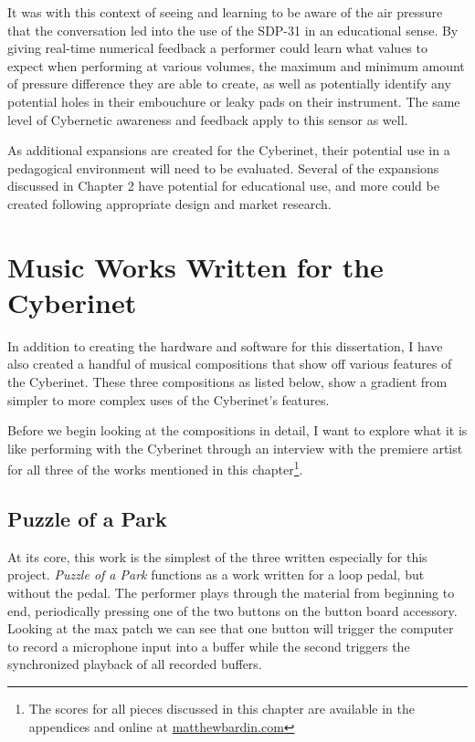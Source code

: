 It was with this context of seeing and learning to be aware of the air pressure that the conversation led into the use of the SDP-31 in an educational sense. By giving real-time numerical feedback a performer could learn what values to expect when performing at various volumes, the maximum and minimum amount of pressure difference they are able to create, as well as potentially identify any potential holes in their embouchure or leaky pads on their instrument. The same level of Cybernetic awareness and feedback apply to this sensor as well.

As additional expansions are created for the Cyberinet, their potential use in a pedagogical environment will need to be evaluated. Several of the expansions discussed in Chapter 2 have potential for educational use, and more could be created following appropriate design and market research.

\chapter{Music Works Written for the Cyberinet}

In addition to creating the hardware and software for this dissertation, I have also created a handful of musical compositions that show off various features of the Cyberinet. These three compositions as listed below, show a gradient from simpler to more complex uses of the Cyberinet’s features.

Before we begin looking at the compositions in detail, I want to explore what it is like performing with the Cyberinet through an interview with the premiere artist for all three of the works mentioned in this chapter\footnote{The scores for all pieces discussed in this chapter are available in the appendices and online at \url{matthewbardin.com}}.


\section{Puzzle of a Park}
At its core, this work is the simplest of the three written especially for this project. \textit{Puzzle of a Park} functions as a work written for a loop pedal, but without the pedal. The performer plays through the material from beginning to end, periodically pressing one of the two buttons on the button board accessory. Looking at the max patch we can see that one button will trigger the computer to record a microphone input into a buffer while the second triggers the synchronized playback of all recorded buffers. 

